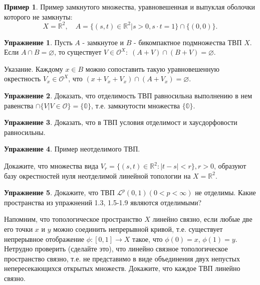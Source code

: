 \documentclass[a4paper, 12pt]{article}
\theoremstyle{definition}
\newtheorem{example}{Пример}
\newtheorem{problem}{Упражнение}[section]
\theoremstyle{remark}
\begin{document}
\begin{example}
    Пример замкнутого множества, уравновешенная и выпуклая оболочки которого не замкнуты:
    \[X=\mathbb R^2, \quad A = \{(s, t)\in \mathbb R^2 | s>0, s\cdot t = 1\}\cap \{(0, 0)\}.\]
\end{example}
\begin{problem}
    Пусть $A$ - замкнутое и $B$ - бикомпактное подмножества ТВП $X$. Если $A\cap B = \varnothing$, то существует $V\in \mathcal O^X: \; (A+V)\cap (B+V) = \varnothing$.

    Указание. Каждому $x\in B$ можно сопоставить такую уравновешенную окрестность $V_x\in \mathcal O^X$, что $(x+V_x+V_x)\cap (A+V_x)=\varnothing$.
\end{problem}
\begin{problem}
    Доказать, что отделимость ТВП равносильна выполнению в нем равенства $\cap \{V|V\in \mathcal O\} = \{\mathbb{0}\}$, т.е. замкнутости множества $\{\mathbb 0\}$.
\end{problem}
\begin{problem}
    Доказать, что в ТВП условия отделимост и хаусдорфовости равносильны.
\end{problem}
\begin{problem}
    Пример неотделимого ТВП.

    Докажите, что множества вида $V_r = \{(s, t)\in \mathbb R^2 : |t-s|<r\}, r>0$, образуют базу окрестностей нуля неотделимой линейной топологии на $X = \mathbb R^2$. 
\end{problem}
\begin{problem} 
    Докажите, что ТВП $\mathcal L^p (0,1)(0<p<\infty)$ не отделимы. Какие пространства из упражнений 1.3, 1.5-1.9 являются отделимыми?
\end{problem}
Напомним, что топологическое пространство $X$ линейно связно, если любые две его точки $x$ и $y$ можно соединить непрерывной кривой, т.е. существует непрерывное отображение $\phi:[0,1]\to X$ такое, что $\phi(0) = x$, $\phi(1) = y$. Нетрудно проверить (сделайте это), что линейно связное топологическое пространство связно, т.е. не представимо в виде объединения двух непустых непересекающихся открытых множеств. Докажите, что каждое ТВП линейно связно.
\end{document}
